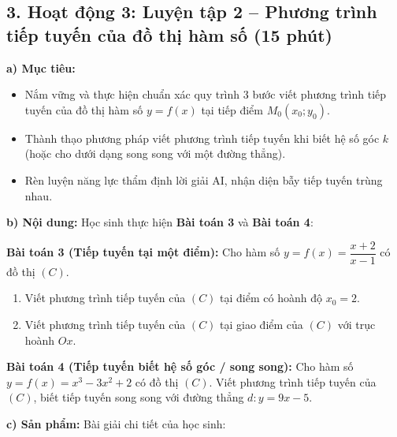 \documentclass[12pt, a4paper]{article}
\begin{document}
\vspace{5pt}

\subsection*{3. Hoạt động 3: Luyện tập 2 -- Phương trình tiếp tuyến của đồ thị hàm số (15 phút)}

\noindent \textbf{a) Mục tiêu:}
\begin{itemize}[leftmargin=0.6cm]
    \item Nắm vững và thực hiện chuẩn xác quy trình 3 bước viết phương trình tiếp tuyến của đồ thị hàm số $y = f(x)$ tại tiếp điểm $M_0(x_0; y_0)$.
    \item Thành thạo phương pháp viết phương trình tiếp tuyến khi biết hệ số góc $k$ (hoặc cho dưới dạng song song với một đường thẳng).
    \item Rèn luyện năng lực thẩm định lời giải AI, nhận diện bẫy tiếp tuyến trùng nhau.
\end{itemize}

\noindent \textbf{b) Nội dung:}
Học sinh thực hiện \textbf{Bài toán 3} và \textbf{Bài toán 4}:

\textbf{Bài toán 3 (Tiếp tuyến tại một điểm):}
Cho hàm số $y = f(x) = \dfrac{x + 2}{x - 1}$ có đồ thị $(C)$.
\begin{enumerate}[label=\alph*)]
    \item Viết phương trình tiếp tuyến của $(C)$ tại điểm có hoành độ $x_0 = 2$.
    \item Viết phương trình tiếp tuyến của $(C)$ tại giao điểm của $(C)$ với trục hoành $Ox$.
\end{enumerate}

\textbf{Bài toán 4 (Tiếp tuyến biết hệ số góc / song song):}
Cho hàm số $y = f(x) = x^3 - 3x^2 + 2$ có đồ thị $(C)$. Viết phương trình tiếp tuyến của $(C)$, biết tiếp tuyến song song với đường thẳng $d: y = 9x - 5$.

\noindent \textbf{c) Sản phẩm:}
Bài giải chi tiết của học sinh:
\end{document}
